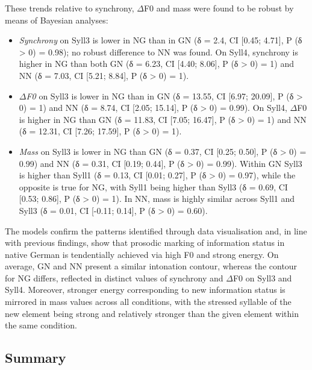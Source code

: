 These trends relative to synchrony, ${\Delta}$F0 and mass were found to be robust by means of Bayesian analyses:

\begin{itemize}
\item \textit{Synchrony} on Syll3 is lower in NG than in GN (δ = 2.4, CI [0.45; 4.71], P (δ > 0) = 0.98); no robust difference to NN was found. On Syll4, synchrony is higher in NG than both GN (δ = 6.23, CI [4.40; 8.06], P (δ > 0) = 1) and NN (δ = 7.03, CI [5.21; 8.84], P (δ > 0) = 1).
\item \textit{${\Delta}$F0} on Syll3 is lower in NG than in GN (δ = 13.55, CI [6.97; 20.09], P (δ > 0) = 1) and NN (δ = 8.74, CI [2.05; 15.14], P (δ > 0) = 0.99). On Syll4, ${\Delta}$F0 is higher in NG than GN (δ = 11.83, CI [7.05; 16.47], P (δ > 0) = 1) and NN (δ = 12.31, CI [7.26; 17.59], P (δ > 0) = 1).
\item \textit{Mass} on Syll3 is lower in NG than GN (δ = 0.37, CI [0.25; 0.50], P (δ > 0) = 0.99) and NN (δ = 0.31, CI [0.19; 0.44], P (δ > 0) = 0.99). Within GN Syll3 is higher than Syll1 (δ = 0.13, CI [0.01; 0.27], P (δ > 0) = 0.97), while the opposite is true for NG, with Syll1 being higher than Syll3 (δ = 0.69, CI [0.53; 0.86], P (δ > 0) = 1). In NN, mass is highly similar across Syll1 and Syll3 (δ = 0.01, CI [-0.11; 0.14], P (δ > 0) = 0.60).
\end{itemize}

The models confirm the patterns identified through data visualisation and, in line with previous findings, show that prosodic marking of information status in native German is tendentially achieved via high F0 and strong energy. On average, GN and NN present a similar intonation contour, whereas the contour for NG differs, reflected in distinct values of synchrony and ${\Delta}$F0 on Syll3 and Syll4. Moreover, stronger energy corresponding to new information status is mirrored in mass values across all conditions, with the stressed syllable of the new element being strong and relatively stronger than the given element within the same condition.

\subsection{Summary}

